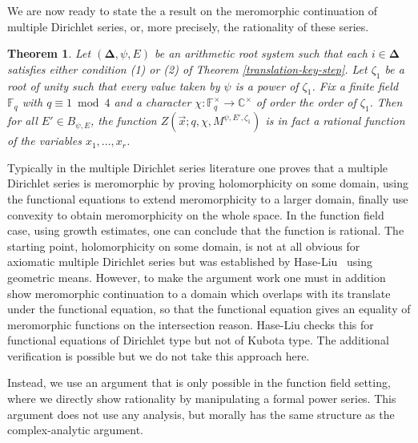 \documentclass[11pt,letterpaper]{article}
\newtheorem{theorem}{Theorem}[section]
\theoremstyle{definition}
\theoremstyle{remark}
\numberwithin{equation}{section}
\theoremstyle{dotless}
\newcommand{\hchi}{\psi} %
\newcommand{\gene}{\zeta_1} %
\begin{document}

We are now ready to state the a result on the meromorphic continuation of multiple Dirichlet series, or, more precisely, the rationality of these series.


\begin{theorem} \label{rational-fn} Let $(\mathbf \Delta, \hchi, E)$ be an arithmetic root system such that each  $i\in \mathbf \Delta$ satisfies either condition (1) or (2) of Theorem \ref{translation-key-step}. Let $\gene$ be a root of unity such that every value taken by $\psi$ is a power of $\gene$. Fix a finite field $\mathbb F_q$ with $q \equiv 1\bmod 4$ and a character $\chi \colon \mathbb F_q^\times \to \mathbb C^\times$ of order the order of $\gene$. Then for all $E' \in B_{\hchi,E}$, the function $Z ( \vec{x}; q, \chi, M^{\hchi, E',\gene}) $ is in fact a rational function of the variables $x_1,\dots,x_r$.
\end{theorem}

Typically in the multiple Dirichlet series literature one proves that a multiple Dirichlet series is meromorphic by proving holomorphicity on some domain, using the functional equations to extend meromorphicity to a larger domain, finally use convexity to obtain meromorphicity on the whole space. In the function field case, using growth estimates, one can conclude that the function is rational.  The starting point, holomorphicity on some domain, is not at all obvious for axiomatic multiple Dirichlet series but was established by Hase-Liu~\cite[Theorem 1]{HaseLiu24} using geometric means. However, to make the argument work one must in addition show meromorphic continuation to a domain which overlaps with its translate under the functional equation, so that the functional equation gives an equality of meromorphic functions on the intersection reason. Hase-Liu checks this for functional equations of Dirichlet type but not of Kubota type. The additional verification is possible but we do not take this approach here.

Instead, we use an argument that is only possible in the function field setting, where we directly show rationality by manipulating a formal power series. This argument does not use any analysis, but morally has the same structure as the complex-analytic argument. 
\end{document}
